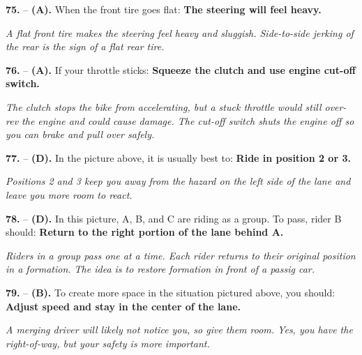 \begin{minipage}{\linewidth}
\noindent\textbf{75.}  -- \textbf {(A).} When the front tire goes flat:  \textbf {The steering will feel heavy.} \par \textit {A flat front tire makes the steering feel heavy and sluggish. Side-to-side jerking of the rear is the sign of a flat rear tire.} \\
\end{minipage}

\begin{minipage}{\linewidth}
\noindent\textbf{76.}  -- \textbf {(A).} If your throttle sticks:  \textbf {Squeeze the clutch and use engine cut-off switch.} \par \textit {The clutch stops the bike from accelerating, but a stuck throttle would still over-rev the engine and could cause damage. The cut-off switch shuts the engine off so you can brake and pull over safely.} \\
\end{minipage}

\begin{minipage}{\linewidth}
\noindent\textbf{77.}  -- \textbf {(D).} In the picture above, it is usually best to:  \textbf {Ride in position 2 or 3.} \par \textit {Positions 2 and 3 keep you away from the hazard on the left side of the lane and leave you more room to react.} \\
\end{minipage}

\begin{minipage}{\linewidth}
\noindent\textbf{78.}  -- \textbf {(D).} In this picture, A, B, and C are riding as a group. To pass, rider B should:  \textbf {Return to the right portion of the lane behind A.} \par \textit {Riders in a group pass one at a time. Each rider returns to their original position in a formation. The idea is to restore formation in front of a passig car.} \\
\end{minipage}

\begin{minipage}{\linewidth}
\noindent\textbf{79.}  -- \textbf {(B).} To create more space in the situation pictured above, you should:  \textbf {Adjust speed and stay in the center of the lane.} \par \textit {A merging driver will likely not notice you, so give them room. Yes, you have the right-of-way, but your safety is more important.} \\
\end{minipage}

